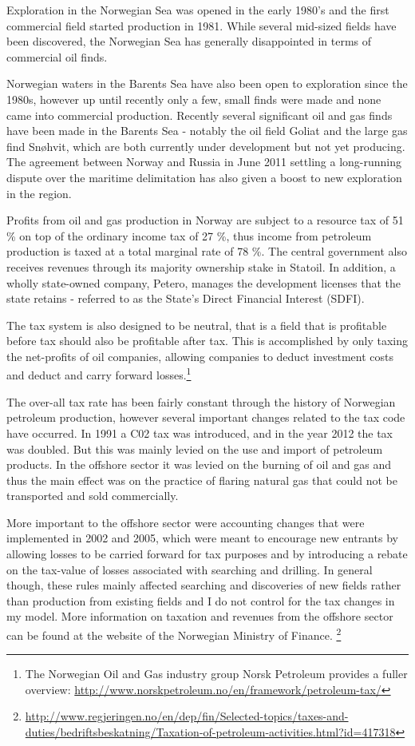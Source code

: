 \documentclass[12pt]{article}
\begin{document}
Exploration in the Norwegian Sea was opened in the early 1980’s and the first commercial field started production in 1981.  While several mid-sized fields have been discovered, the Norwegian Sea has generally disappointed in terms of commercial oil finds.  

Norwegian waters in the Barents Sea have also been open to exploration since the 1980s, however up until recently only a few, small finds were made and none came into commercial production.  Recently several significant oil and gas finds have been made in the Barents Sea - notably the oil field Goliat and the large gas find Sn\o hvit, which are both currently under development but not yet producing.  The agreement between Norway and Russia in June 2011 settling a long-running dispute over the maritime delimitation has also given a boost to new exploration in the region.  

Profits from oil and gas production in Norway are subject to a resource tax of 51 \% on top of the ordinary income tax of 27 \%, thus income from petroleum production is taxed at a total marginal rate of 78 \%.  The central government also receives revenues through its majority ownership stake in Statoil. In addition, a wholly state-owned company, Petero, manages the development licenses that the state retains - referred to as the State's Direct Financial Interest (SDFI).

The tax system is also designed to be neutral, that is a field that is profitable before tax should also be profitable after tax. This is accomplished by only taxing the net-profits of oil companies, allowing companies to deduct investment costs and deduct and carry forward losses.\footnote{The Norwegian Oil and Gas industry group Norsk Petroleum provides a fuller overview: \url{http://www.norskpetroleum.no/en/framework/petroleum-tax/}}

The over-all tax rate has been fairly constant through the history of Norwegian petroleum production, however several important changes related to the tax code have occurred.  In 1991 a C02 tax was introduced, and in the year 2012 the tax was doubled.  But this was mainly levied on the use and import of petroleum products.  In the offshore sector it was levied on the burning of oil and gas and thus the main effect was on the practice of flaring natural gas that could not be transported and sold commercially.

More important to the offshore sector were accounting changes that were implemented in 2002 and 2005, which were meant to encourage new entrants by allowing losses to be carried forward for tax purposes and by introducing a rebate on the tax-value of losses associated with searching and drilling.  In general though, these rules mainly affected searching and discoveries of new fields rather than production from existing fields and I do not control for the tax changes in my model.  More information on taxation and revenues from the offshore sector can be found at the website of the Norwegian Ministry of Finance. \footnote{\url{http://www.regjeringen.no/en/dep/fin/Selected-topics/taxes-and-duties/bedriftsbeskatning/Taxation-of-petroleum-activities.html?id=417318}}
\end{document}
